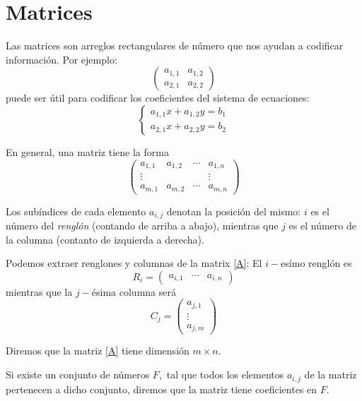 \section{Matrices}


Las matrices son arreglos rectangulares de n\'umero que nos ayudan a codificar informaci\'on. Por ejemplo:
$$
\begin{pmatrix}
	a_{1,1} & a_{1,2} \\
	a_{2,1} & a_{2,2}
\end{pmatrix}
$$
puede ser \'util para codificar los coeficientes del sistema de ecuaciones:
$$
\begin{cases}
	a_{1,1}x+a_{1,2}y=b_{1}\\
	a_{2,1}x+a_{2,2}y=b_{2}
\end{cases}
$$



En general, una matriz tiene la forma 
\begin{equation}
	\label{A}
	\tag{A}
	\begin{pmatrix}
		a_{1,1} & a_{1,2} & \cdots & a_{1,n} \\
		\vdots & & & \vdots\\
		a_{m,1} & a_{m,2} & \cdots & a_{m,n} 
	\end{pmatrix}
\end{equation} 

Los sub\'indices de cada elemento $a_{i,j}$ denotan la posici\'on del mismo: $i$ es el n\'umero del \emph{rengl\'on} (contando de arriba a abajo), mientras que $j$ es el n\'umero de la columna (contanto de izquierda a derecha).



Podemos extraer renglones y columnas de la matrix \eqref{A}: El $i-$es\'imo rengl\'on es
$$
R_{i}=
\begin{pmatrix}
	a_{i,1} & \cdots & a_{i,n}
\end{pmatrix}
$$ 
mientras que la $j-$\'esima columna ser\'a
$$
C_{j}=
\begin{pmatrix}
	a_{j,1} \\
	\vdots \\
	a_{j,m}
\end{pmatrix}
$$



Diremos que la matriz \eqref{A} tiene dimensi\'on $m\times n.$ 

Si existe un conjunto de n\'umeros $F,$ tal que todos los elementos $a_{i,j}$ de la matriz pertenecen a dicho conjunto, diremos que la matriz tiene coeficientes en $F.$ 



